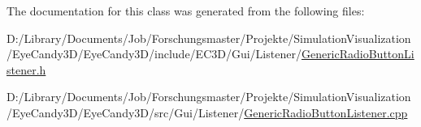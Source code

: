 The documentation for this class was generated from the following files\+:\begin{DoxyCompactItemize}
\item 
D\+:/\+Library/\+Documents/\+Job/\+Forschungsmaster/\+Projekte/\+Simulation\+Visualization/\+Eye\+Candy3\+D/\+Eye\+Candy3\+D/include/\+E\+C3\+D/\+Gui/\+Listener/\mbox{\hyperlink{_generic_radio_button_listener_8h}{Generic\+Radio\+Button\+Listener.\+h}}\item 
D\+:/\+Library/\+Documents/\+Job/\+Forschungsmaster/\+Projekte/\+Simulation\+Visualization/\+Eye\+Candy3\+D/\+Eye\+Candy3\+D/src/\+Gui/\+Listener/\mbox{\hyperlink{_generic_radio_button_listener_8cpp}{Generic\+Radio\+Button\+Listener.\+cpp}}\end{DoxyCompactItemize}
